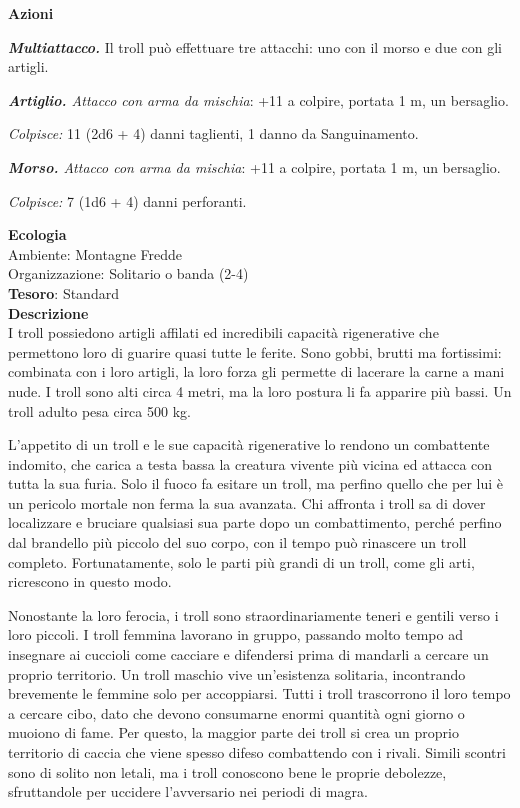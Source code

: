 \begin{multicols}{2}
\textbf{Azioni}

\textit{\textbf{Multiattacco.}} Il troll può effettuare tre attacchi: uno con il morso e due con gli artigli.

\textit{\textbf{Artiglio.} Attacco con arma da mischia}: +11 a colpire, portata 1 m, un bersaglio.

\textit{Colpisce:} 11 (2d6 + 4) danni taglienti, 1 danno da Sanguinamento.

\textit{\textbf{Morso.} Attacco con arma da mischia}: +11 a colpire, portata 1 m, un bersaglio.

\textit{Colpisce:} 7 (1d6 + 4) danni perforanti.

\textbf{Ecologia}\\
Ambiente: Montagne Fredde\\
Organizzazione: Solitario o banda (2-4)\\
\textbf{Tesoro}: Standard\\
\textbf{Descrizione}\\
I troll possiedono artigli affilati ed incredibili capacità rigenerative che permettono loro di guarire quasi tutte le ferite. Sono gobbi, brutti ma fortissimi: combinata con i loro artigli, la loro forza gli permette di lacerare la carne a mani nude. I troll sono alti circa 4 metri, ma la loro postura li fa apparire più bassi. Un troll adulto pesa circa 500 kg.

L'appetito di un troll e le sue capacità rigenerative lo rendono un combattente indomito, che carica a testa bassa la creatura vivente più vicina ed attacca con tutta la sua furia. Solo il fuoco fa esitare un troll, ma perfino quello che per lui è un pericolo mortale non ferma la sua avanzata. Chi affronta i troll sa di dover localizzare e bruciare qualsiasi sua parte dopo un combattimento, perché perfino dal brandello più piccolo del suo corpo, con il tempo può rinascere un troll completo. Fortunatamente, solo le parti più grandi di un troll, come gli arti, ricrescono in questo modo.

Nonostante la loro ferocia, i troll sono straordinariamente teneri e gentili verso i loro piccoli. I troll femmina lavorano in gruppo, passando molto tempo ad insegnare ai cuccioli come cacciare e difendersi prima di mandarli a cercare un proprio territorio. Un troll maschio vive un'esistenza solitaria, incontrando brevemente le femmine solo per accoppiarsi. Tutti i troll trascorrono il loro tempo a cercare cibo, dato che devono consumarne enormi quantità ogni giorno o muoiono di fame. Per questo, la maggior parte dei troll si crea un proprio territorio di caccia che viene spesso difeso combattendo con i rivali. Simili scontri sono di solito non letali, ma i troll conoscono bene le proprie debolezze, sfruttandole per uccidere l'avversario nei periodi di magra.


\end{multicols}
